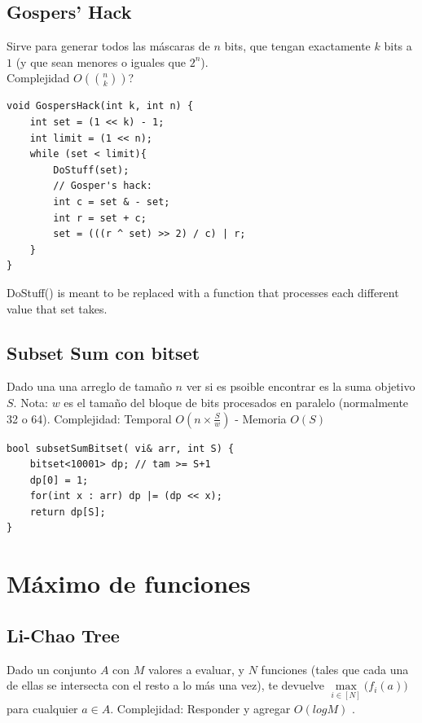 \documentclass[12 pts,spanish,mexico]{article}
\numberwithin{equation}{section}
\newcommand{\pa}[1]{\left( #1 \right)}
\begin{document}
\begin{multicols}{2}
\subsection{Gospers’ Hack}
Sirve para generar todos las máscaras de $n$ bits, que tengan exactamente $k$ bits a $1$ (y que sean menores o iguales que $2^n$). \\
Complejidad $O\pa{\binom{n}{k}}$?
\begin{verbatim}
void GospersHack(int k, int n) {
    int set = (1 << k) - 1;
    int limit = (1 << n);
    while (set < limit){
        DoStuff(set);
        // Gosper's hack:
        int c = set & - set;
        int r = set + c;
        set = (((r ^ set) >> 2) / c) | r;
    }
}
\end{verbatim}
DoStuff() is meant to be replaced with a function that processes each different value that set takes.

\subsection{Subset Sum con bitset}
Dado una una arreglo de tamaño \(n\) ver si es psoible encontrar es la suma objetivo  \(S\). Nota: \(w\) es el tamaño del bloque de bits procesados en paralelo (normalmente 32 o 64). Complejidad:  Temporal \(O\left(n \times \frac{S}{w}\right)\) -  Memoria \(O(S)\)

\begin{verbatim}
bool subsetSumBitset( vi& arr, int S) {
    bitset<10001> dp; // tam >= S+1
    dp[0] = 1;
    for(int x : arr) dp |= (dp << x);
    return dp[S];
}
\end{verbatim}


\section{Máximo de funciones}

\subsection{Li-Chao Tree}
Dado un conjunto $A$ con $M$ valores a evaluar, y $N$ funciones (tales que cada una de ellas se intersecta con el resto a lo más una vez), te devuelve $\max\limits_{i\in [N]} \big(f_i(a)\big)$ para cualquier  $a\in A$. Complejidad: Responder y agregar $O(log M)$ .


\end{multicols}
\end{document}
